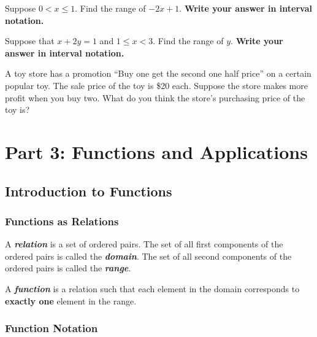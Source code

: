 \documentclass[en,12pt]{elegantbook}
\let\BeginKnitrBlock\begin \let\EndKnitrBlock\end
\begin{document}
\BeginKnitrBlock{exercise}
\protect\hypertarget{exr:unnamed-chunk-244}{}{\label{exr:unnamed-chunk-244} }
Suppose \(0< x \le 1\). Find the range of \(-2x+1\). \textbf{Write your answer in interval notation.}
\EndKnitrBlock{exercise}

\BeginKnitrBlock{exercise}
\protect\hypertarget{exr:unnamed-chunk-245}{}{\label{exr:unnamed-chunk-245} }
Suppose that \(x+2y=1\) and \(1\leq x< 3\). Find the range of \(y\). \textbf{Write your answer in interval notation.}
\EndKnitrBlock{exercise}

\BeginKnitrBlock{exercise}
\protect\hypertarget{exr:unnamed-chunk-246}{}{\label{exr:unnamed-chunk-246} }
A toy store has a promotion ``Buy one get the second one half price'' on a certain popular toy. The sale price of the toy is \$20 each. Suppose the store makes more profit when you buy two. What do you think the store's purchasing price of the toy is?
\EndKnitrBlock{exercise}

\hypertarget{part-part-3-functions-and-applications}{%
\part*{Part 3: Functions and Applications}\label{part-part-3-functions-and-applications}}

\hypertarget{introduction-to-functions}{%
\chapter{Introduction to Functions}\label{introduction-to-functions}}

\hypertarget{functions-as-relations}{%
\section{Functions as Relations}\label{functions-as-relations}}

A \textbf{\emph{relation}} is a set of ordered pairs. The set of all first components of the ordered pairs is called the \textbf{\emph{domain}}. The set of all second components of the ordered pairs is called the \textbf{\emph{range}}.

A \textbf{\emph{function}} is a relation such that each element in the domain corresponds to \textbf{exactly one} element in the range.

\hypertarget{function-notation}{%
\section{Function Notation}\label{function-notation}}
\end{document}
